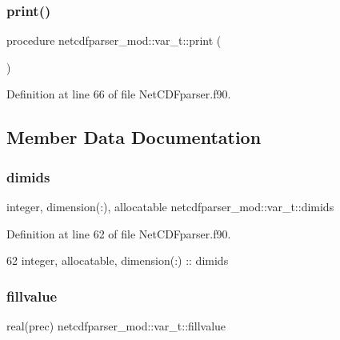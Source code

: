 \subsubsection{\texorpdfstring{print()}{print()}}
{\footnotesize\ttfamily procedure netcdfparser\+\_\+mod\+::var\+\_\+t\+::print (\begin{DoxyParamCaption}{ }\end{DoxyParamCaption})\hspace{0.3cm}{\ttfamily [private]}}



Definition at line 66 of file Net\+C\+D\+Fparser.\+f90.



\subsection{Member Data Documentation}
\mbox{\label{structnetcdfparser__mod_1_1var__t_a1bb991339dd3410a02d8e36a70672e61}} 
\subsubsection{\texorpdfstring{dimids}{dimids}}
{\footnotesize\ttfamily integer, dimension(\+:), allocatable netcdfparser\+\_\+mod\+::var\+\_\+t\+::dimids\hspace{0.3cm}{\ttfamily [private]}}



Definition at line 62 of file Net\+C\+D\+Fparser.\+f90.


\begin{DoxyCode}
62         \textcolor{keywordtype}{integer}, \textcolor{keywordtype}{allocatable}, \textcolor{keywordtype}{dimension(:)} :: dimids
\end{DoxyCode}
\mbox{\label{structnetcdfparser__mod_1_1var__t_a8e89e092236a61f096a44ad123d4d35e}} 
\subsubsection{\texorpdfstring{fillvalue}{fillvalue}}
{\footnotesize\ttfamily real(prec) netcdfparser\+\_\+mod\+::var\+\_\+t\+::fillvalue\hspace{0.3cm}{\ttfamily [private]}}



